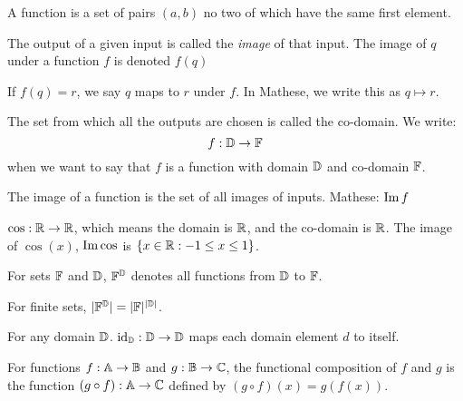 \begin{definition}[Function]
  A function is a set of pairs $(a, b)$ no two of which have the same first element.
\end{definition}

\begin{definition}[Image]
  The output of a given input is called the \emph{image} of that input. The image of $q$ under a function $f$ is denoted $f(q)$
\end{definition}

If $f(q) = r$, we say $q$ maps to $r$ under $f$. In Mathese, we write this as $q \mapsto r$.

The set from which all the outputs are chosen is called the co-domain.
We write:
\begin{equation*}
  f : {\mathbb{D}} \rightarrow {\mathbb{F}}
\end{equation*}
when we want to say that $f$ is a function with domain ${\mathbb{D}}$ and co-domain ${\mathbb{F}}$.

\begin{definition}
  The image of a function is the set of all images of inputs. Mathese: $\operatorname{Im} f$
\end{definition}

\begin{example}
  $\cos : \mathbb{R} \rightarrow \mathbb{R}$, which means the domain is $\mathbb{R}$, and the co-domain is $\mathbb{R}$. The image of $\cos(x)$, $\operatorname{Im} \cos$ is $\{ x\in\mathbb{R} : -1 \le x \le 1 \}$.
\end{example}

\begin{definition}
  For sets ${\mathbb{F}}$ and ${\mathbb{D}}$, ${\mathbb{F}}^{{\mathbb{D}}}$ denotes all functions from ${\mathbb{D}}$ to ${\mathbb{F}}$.
\end{definition}

\begin{proposition}
  For finite sets, $|{\mathbb{F}}^{{\mathbb{D}}}| = |{\mathbb{F}}|^{|{\mathbb{D}}|}$.
\end{proposition}

\begin{definition}
  For any domain ${\mathbb{D}}$. $\mathrm{id}_{{\mathbb{D}}} : {\mathbb{D}} \rightarrow {\mathbb{D}}$ maps each domain element $d$ to itself.
\end{definition}

\begin{definition}
  For functions $f : {\mathbb{A}} \rightarrow {\mathbb{B}}$ and $g : {\mathbb{B}} \rightarrow {\mathbb{C}}$, the functional composition of $f$ and $g$ is the function $(g \circ f) : {\mathbb{A}} \rightarrow {\mathbb{C}}$ defined by $(g \circ f)(x) = g(f(x))$.
\end{definition}

